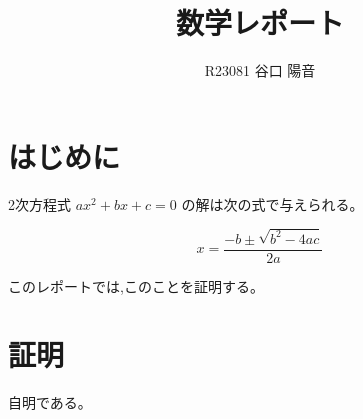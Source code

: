 \documentclass{jlreq}
\begin{document}
\title{数学レポート}
\author{R23081 谷口 陽音}
\maketitle

\section{はじめに}

2次方程式 $ax^2+bx+c=0$ の解は次の式で与えられる。

\[ x = \frac{-b\pm\sqrt{b^2-4ac}}{2a} \]

このレポートでは,このことを証明する。

\section{証明}

自明である。
\end{document}
